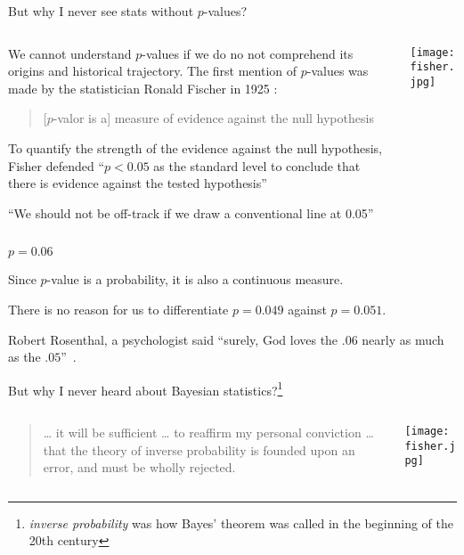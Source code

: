 \begin{frame}{But why I never see stats without $p$-values?}
	\begin{columns}
		\begin{column}{0.8\textwidth}
			We cannot understand $p$-values if we do no not comprehend
			its origins and historical trajectory.
			The first mention of $p$-values was made by the statistician
			Ronald Fischer in 1925 \parencite{fisher1925statistical}:
			\begin{quotation}
				[$p$-valor is a] measure of evidence against the null hypothesis
			\end{quotation}
			\begin{vfilleditems}
				\item To quantify the strength of the evidence against the null hypothesis,
				Fisher defended ``$p<0.05$ as the standard level to conclude that there is evidence against the tested hypothesis''
				\item ``We should not be off-track if we draw a conventional line at 0.05''
			\end{vfilleditems}
		\end{column}
		\begin{column}{0.2\textwidth}
			\centering
			\texttt{[image: fisher.jpg]}
		\end{column}
	\end{columns}
\end{frame}

\begin{frame}{$p = 0.06$}
	\begin{vfilleditems}
		\item Since $p$-value is a probability, it is also a continuous measure.
		\item There is no reason for us to differentiate $p = 0.049$ against $p = 0.051$.
		\item Robert Rosenthal, a psychologist said ``surely, God loves the $.06$ nearly as much as the $.05$''~\parencite{rosnow1989statistical}.
	\end{vfilleditems}
\end{frame}

\begin{frame}{But why I never heard about Bayesian statistics?\footnote{\textit{inverse probability}
			was how Bayes' theorem was called in the beginning of the 20th century}}
	\begin{columns}
		\begin{column}{0.8\textwidth}
			\begin{quotation}
				… it will be sufficient … to reaffirm my personal conviction …
				that the theory of inverse probability is founded upon an error,
				and must be wholly rejected.
			\end{quotation}
			\vfill \vfill
			\textcite{fisher1925statistical}
		\end{column}
		\begin{column}{0.2\textwidth}
			\centering
			\texttt{[image: fisher.jpg]}
		\end{column}
	\end{columns}
\end{frame}


